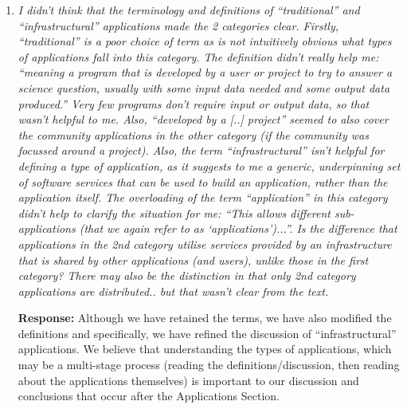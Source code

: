\documentclass{article}
\newcommand{\katznote}[1]{{\textcolor{magenta} { ***Dan: #1 }}}
\newcommand{\katznote}[1]{}
\begin{document}
\begin{enumerate}
\textbf{Response:} 

\katznote{attention needed here re distributed and dynamic part of comment}

\katznote{Neil will add a sentence in the start of Section 2 to say how we are using distributed and how we are using dynamic, in the text that refers to Figure 1.}

In addition, recognizing that the two reviewers have different styles of reading
and different areas of expertise (as do we as authors), we have added a paragraph at the end
of Section 1 to explain how different types of readers might want to approach this paper.  We do
not believe that there is one single way of organizing it that would satisfy all readers.  We have also
added a longer description of each section at this same place.  Also, see our response to point 10 below.

\hspace{-0.7cm}Section 2. 

\item \emph{I didn't think that the terminology and definitions of ``traditional'' and ``infrastructural'' applications made the 2 categories clear. Firstly, ``traditional'' is a poor choice of term as is not intuitively obvious what types of applications fall into this category. The definition didn't really help me: ``meaning a program that is developed by a user or project to try to answer a science question, usually with some input data needed and some output data produced.'' Very few programs don't require input or output data, so that wasn't helpful to me. Also, ``developed by a [..] project'' seemed to also cover the community applications in the other category (if the community was focussed around a project). Also, the term ``infrastructural'' isn't helpful for defining a type of application, as it suggests to me a generic, underpinning set of software services that can be used to build an application, rather than the application itself. The overloading of the term ``application'' in this category didn't help to clarify the situation for me: ``This allows different sub-applications (that we again refer to as `applications')...''. Is the difference that applications in the 2nd category utilise services provided by an infrastructure that is shared by other applications (and users), unlike those in the first category? There may also be the distinction in that only 2nd category applications are distributed.. but that wasn't clear from the text.} 


\textbf{Response:} Although we have retained the terms, we have also modified the definitions and specifically, we have refined the discussion of ``infrastructural'' applications.  We believe that
understanding the types of applications, which may be a multi-stage process (reading the definitions/discussion, then reading about the applications themselves) is important to our discussion and conclusions that occur after the Applications Section.


\end{enumerate}
\end{document}
